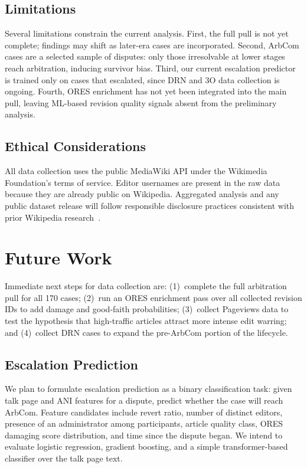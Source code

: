 \documentclass[conference]{IEEEtran}
\begin{document}
\subsection{Limitations}

Several limitations constrain the current analysis. First, the full pull is
not yet complete; findings may shift as later-era cases are incorporated.
Second, ArbCom cases are a selected sample of disputes: only those
irresolvable at lower stages reach arbitration, inducing survivor bias. Third,
our current escalation predictor is trained only on cases that escalated,
since DRN and 3O data collection is ongoing. Fourth, ORES enrichment has not
yet been integrated into the main pull, leaving ML-based revision quality
signals absent from the preliminary analysis.

\subsection{Ethical Considerations}

All data collection uses the public MediaWiki API under the Wikimedia
Foundation's terms of service. Editor usernames are present in the raw data
because they are already public on Wikipedia. Aggregated analysis and any
public dataset release will follow responsible disclosure practices consistent
with prior Wikipedia research~\cite{b_halfaker2013}.

\section{Future Work}

Immediate next steps for data collection are: (1)~complete the full
arbitration pull for all 170 cases; (2)~run an ORES enrichment pass over all
collected revision IDs to add damage and good-faith probabilities;
(3)~collect Pageviews data to test the hypothesis that high-traffic articles
attract more intense edit warring; and (4)~collect DRN cases to expand the
pre-ArbCom portion of the lifecycle.

\subsection{Escalation Prediction}

We plan to formulate escalation prediction as a binary classification task:
given talk page and ANI features for a dispute, predict whether the case will
reach ArbCom. Feature candidates include revert ratio, number of distinct
editors, presence of an administrator among participants, article quality
class, ORES damaging score distribution, and time since the dispute began.
We intend to evaluate logistic regression, gradient boosting, and a simple
transformer-based classifier over the talk page text.
\end{document}
